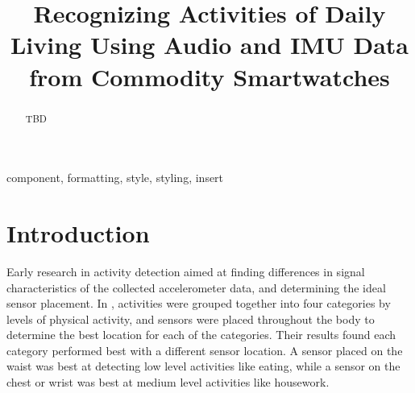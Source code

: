 \documentclass[conference]{IEEEtran}
\begin{document}
	
	\title{Recognizing Activities of Daily Living Using Audio and IMU Data from Commodity Smartwatches
	}
	
	\author{
		
		\and
		
		\and
	}
	
	\maketitle
	
	\begin{abstract}
		TBD
	\end{abstract}
	
	\begin{IEEEkeywords}
		component, formatting, style, styling, insert
	\end{IEEEkeywords}
	
	\section{Introduction}
	
	Early research in activity detection aimed at finding differences in signal characteristics of the collected accelerometer data, and determining the ideal sensor placement. 
	In \cite{2011_Sensor_Positioning}, activities were grouped together into four categories by levels of physical activity, and sensors were placed throughout the body to determine the best location for each of the categories.
	Their results found each category performed best with a different sensor location. A sensor placed on the waist was best at detecting low level activities like eating, while a sensor on the chest or wrist was best at medium level activities like housework.
	
\end{document}
